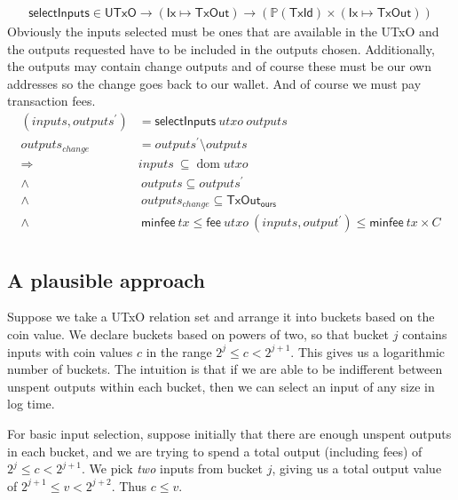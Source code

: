 \documentclass{article}
\newcommand{\powerset}[1]{\mathbb{P}(#1)}
\DeclareMathOperator{\dom}{dom}
\theoremstyle{definition}{
  \newtheorem{lemma}{Lemma}[section] %
  \newtheorem{definition}[lemma]{Definition}
}
\theoremstyle{theorem}{
  \newtheorem{invariant}[lemma]{Invariant}
  \newtheorem{proofobligation}[lemma]{Proof Obligation}
}
\numberwithin{equation}{lemma}
\begin{document}
\begin{equation}
\begin{split}
\mathsf{selectInputs} \in \mathsf{UTxO} \to (\mathsf{Ix} \mapsto \mathsf{TxOut})
                      \to (\powerset{\mathsf{TxId}} \times (\mathsf{Ix} \mapsto \mathsf{TxOut}))
\end{split}
\end{equation}
Obviously the inputs selected must be ones that are available in the UTxO and
the outputs requested have to be included in the outputs chosen. Additionally,
the outputs may contain change outputs and of course these must be our own
addresses so the change goes back to our wallet. And of course we must pay
transaction fees.
\begin{equation}
\begin{split}
(inputs, outputs^\prime) & = \mathsf{selectInputs} ~ utxo ~ outputs \\
outputs_{change} & = outputs^\prime \setminus outputs \\
 \Longrightarrow \quad & inputs ~ \subseteq \dom utxo \\
\wedge & ~ outputs \subseteq outputs^\prime \\
\wedge & ~ outputs_{change} \subseteq \mathsf{TxOut_{ours}} \\
\wedge & ~ \mathsf{minfee} ~ tx \leq \mathsf{fee} ~ utxo ~ (inputs, output^\prime) \leq \mathsf{minfee} ~ tx \times C\\
\end{split}
\end{equation}

\subsection{A plausible approach}

Suppose we take a UTxO relation set and arrange it into buckets based on the
coin value. We declare buckets based on powers of two, so that bucket $j$
contains inputs with coin values $c$ in the range $2^j \leq c < 2^{j+1}$. This
gives us a logarithmic number of buckets. The intuition is that if we are able
to be indifferent between unspent outputs within each bucket, then we can
select an input of any size in log time.

For basic input selection, suppose initially that there are enough unspent
outputs in each bucket, and we are trying to spend a total output (including
fees) of $2^j \leq c < 2^{j+1}$. We pick \emph{two} inputs from bucket $j$,
giving us a total output value of $2^{j+1} \leq v < 2^{j+2}$. Thus $c \leq v$.
\end{document}
